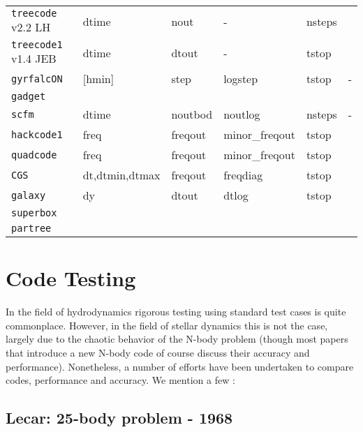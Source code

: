 {\begin{center}
\begin{table}[h]
\begin{tabular}{||l|l|l|l|l|l||}
{\tt treecode} v2.2 LH      & dtime & nout & - & nsteps &  \\
{\tt treecode1} v1.4 JEB    & dtime & dtout & - & tstop &  \\

{\tt gyrfalcON}      & [hmin] & step & logstep & tstop & - \\

{\tt gadget}         &  & & & & \\

{\tt scfm}           & dtime & noutbod & noutlog & nsteps & - \\


{\tt hackcode1}      & freq & freqout & minor\_freqout & tstop & \\
{\tt quadcode}       & freq & freqout & minor\_freqout & tstop & \\


{\tt CGS}            & dt,dtmin,dtmax & freqout & freqdiag & tstop & \\

{\tt galaxy}         & dy & dtout & dtlog & tstop & \\

{\tt superbox}       & & & & & \\

{\tt partree}       & & & & & \\

\hline 

\end{tabular}
\label{t:codekeys}
\end{table}
\end{center}


\chapter                {Code Testing}

In the field of hydrodynamics rigorous testing using standard
test cases is quite commonplace. However, 
in the field of stellar dynamics this is not the case, largely due to
the chaotic behavior of the N-body problem 
(though
most papers that introduce a new N-body code of course discuss
their accuracy and performance).
Nonetheless, a
number of efforts have been undertaken to compare codes, performance and
accuracy. We mention a few :


\section{Lecar: 25-body problem - 1968}

}
